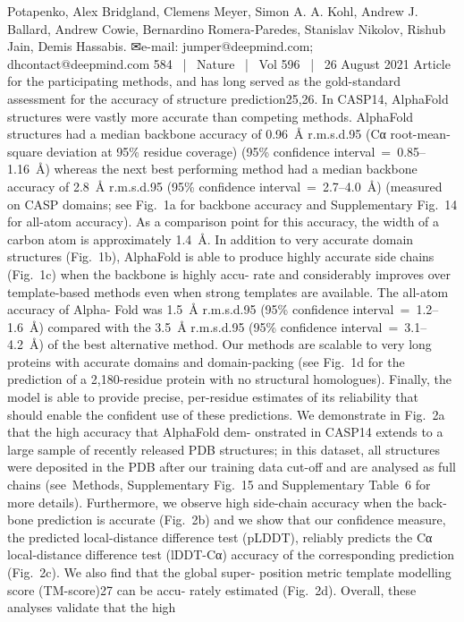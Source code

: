 Potapenko, Alex Bridgland, Clemens Meyer, Simon A. A. Kohl, Andrew J. Ballard, Andrew Cowie, Bernardino Romera-Paredes, Stanislav Nikolov, Rishub Jain, Demis Hassabis.
✉e-mail: jumper@deepmind.com; dhcontact@deepmind.com
584  |  Nature  |  Vol 596  |  26 August 2021
Article
for the participating methods, and has long served as the gold-standard
assessment for the accuracy of structure prediction25,26.
In CASP14, AlphaFold structures were vastly more accurate than
competing methods. AlphaFold structures had a median backbone
accuracy of 0.96 Å r.m.s.d.95 (Cα root-mean-square deviation at 95\%
residue coverage) (95\% confidence interval = 0.85–1.16 Å) whereas
the next best performing method had a median backbone accuracy
of 2.8 Å r.m.s.d.95 (95\% confidence interval = 2.7–4.0 Å) (measured on
CASP domains; see Fig. 1a for backbone accuracy and Supplementary
Fig. 14 for all-atom accuracy). As a comparison point for this accuracy,
the width of a carbon atom is approximately 1.4 Å. In addition to very
accurate domain structures (Fig. 1b), AlphaFold is able to produce
highly accurate side chains (Fig. 1c) when the backbone is highly accu-
rate and considerably improves over template-based methods even
when strong templates are available. The all-atom accuracy of Alpha-
Fold was 1.5 Å r.m.s.d.95 (95\% confidence interval = 1.2–1.6 Å) compared
with the 3.5 Å r.m.s.d.95 (95\% confidence interval = 3.1–4.2 Å) of the best
alternative method. Our methods are scalable to very long proteins with
accurate domains and domain-packing (see Fig. 1d for the prediction
of a 2,180-residue protein with no structural homologues). Finally, the
model is able to provide precise, per-residue estimates of its reliability
that should enable the confident use of these predictions.
We demonstrate in Fig. 2a that the high accuracy that AlphaFold dem-
onstrated in CASP14 extends to a large sample of recently released PDB
structures; in this dataset, all structures were deposited in the PDB after
our training data cut-off and are analysed as full chains (see Methods,
Supplementary Fig. 15 and Supplementary Table 6 for more details).
Furthermore, we observe high side-chain accuracy when the back-
bone prediction is accurate (Fig. 2b) and we show that our confidence
measure, the predicted local-distance difference test (pLDDT), reliably
predicts the Cα local-distance difference test (lDDT-Cα) accuracy of the
corresponding prediction (Fig. 2c). We also find that the global super-
position metric template modelling score (TM-score)27 can be accu-
rately estimated (Fig. 2d). Overall, these analyses validate that the high
